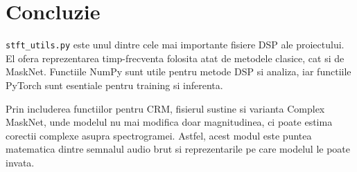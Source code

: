 \documentclass[12pt,a4paper]{report}
\begin{document}
\chapter{Concluzie}

\texttt{stft\_utils.py} este unul dintre cele mai importante fisiere DSP ale
proiectului. El ofera reprezentarea timp-frecventa folosita atat de metodele
clasice, cat si de MaskNet. Functiile NumPy sunt utile pentru metode DSP si
analiza, iar functiile PyTorch sunt esentiale pentru training si inferenta.

Prin includerea functiilor pentru CRM, fisierul sustine si varianta Complex
MaskNet, unde modelul nu mai modifica doar magnitudinea, ci poate estima corectii
complexe asupra spectrogramei. Astfel, acest modul este puntea matematica dintre
semnalul audio brut si reprezentarile pe care modelul le poate invata.
\end{document}
